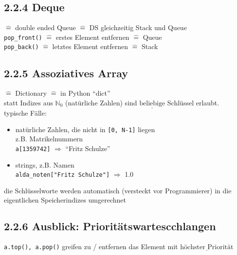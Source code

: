 \documentclass[11pt, fleqn]{scrreprt}
\begin{document}
        \subsection*{2.2.4 Deque}
        $\widehat{=}$ double ended Queue $\widehat{=}$ DS gleichzeitig Stack und Queue \\

        \verb|pop_front()| $\widehat{=}$ erstes Element entfernen $\widehat{=}$ Queue \\
        \verb|pop_back()| $\widehat{=}$ letztes Element entfernen $\widehat{=}$ Stack \\

        \subsection*{2.2.5 Assoziatives Array}
        $\widehat{=}$ Dictionary $\widehat{=}$ in Python ``dict'' \\

        statt Indizes aus $\mathbb{N}_{0}$ (natürliche Zahlen) sind $\underline{\text{beliebige}}$ Schlüssel erlaubt. \\

        typische Fälle:
        \begin{itemize}[label={-}]
            \item natürliche Zahlen, die nicht in \verb|[0, N-1]| liegen \\
            z.B. Matrikelnummern \\
            \verb|a[1359742]| $\Rightarrow$ ``Fritz Schulze''
            \item strings, z.B. Namen \\
            \verb|alda_noten["Fritz Schulze"]| $\Rightarrow$ 1.0
        \end{itemize}
        die Schlüsselworte werden automatisch (versteckt vor Programmierer) in die eigentlichen Speicherindizes umgerechnet \\

        \subsection*{2.2.6 Ausblick: Prioritätswartescchlangen}
        \verb|a.top(), a.pop()| greifen zu / entfernen das Element mit $\underline{\text{höchster Priorität}}$\\
\end{document}
